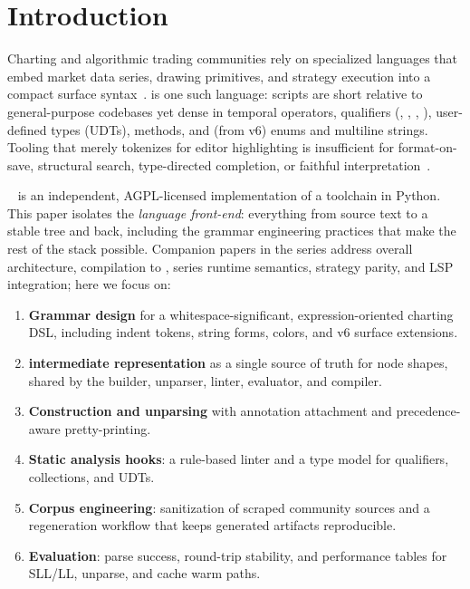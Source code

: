 \documentclass[11pt,a4paper]{article}
\begin{document}
\section{Introduction}
\label{sec:intro}

Charting and algorithmic trading communities rely on specialized languages that
embed market data series, drawing primitives, and strategy execution into a
compact surface syntax~\citep{fowler2010dsl,hudak1996dsl,tradingview-pine}.
\pine{} is one such language: scripts are short relative to general-purpose
codebases yet dense in temporal operators, qualifiers (,
, , ), user-defined types (UDTs), methods,
and (from v6) enums and multiline strings.
Tooling that merely tokenizes for editor highlighting is insufficient for
format-on-save, structural search, type-directed completion, or faithful
interpretation~\citep{lsp2023,nystrom2021crafting}.

\pyne{}~\citep{pynescript2026} is an independent, AGPL-licensed implementation of a
\pine{} toolchain in Python. This paper isolates the \emph{language front-end}:
everything from source text to a stable \asdl{} tree and back, including the
grammar engineering practices that make the rest of the stack possible.
Companion papers in the series address overall architecture, compilation to
\numba{}, series runtime semantics, strategy parity, and LSP integration; here
we focus on:

\begin{enumerate}[leftmargin=*]
  \item \textbf{Grammar design} for a whitespace-significant, expression-oriented
    charting DSL, including indent tokens, string forms, colors, and v6 surface
    extensions.
  \item \textbf{\asdl{} intermediate representation} as a single source of truth
    for node shapes, shared by the builder, unparser, linter, evaluator, and
    compiler.
  \item \textbf{Construction and unparsing} with annotation attachment and
    precedence-aware pretty-printing.
  \item \textbf{Static analysis hooks}: a rule-based linter and a type model for
    qualifiers, collections, and UDTs.
  \item \textbf{Corpus engineering}: sanitization of scraped community sources
    and a regeneration workflow that keeps generated artifacts reproducible.
  \item \textbf{Evaluation}: parse success, round-trip stability, and
    performance tables for SLL/LL, unparse, and cache warm paths.
\end{enumerate}
\end{document}
